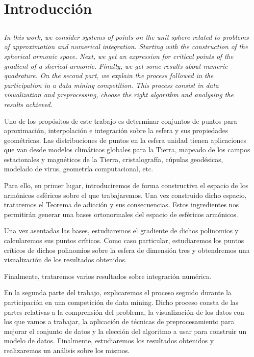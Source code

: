 \chapter*{Introducción}

\section*{}
\emph{In this work, we consider systems of points on the unit sphere related to problems of approximation and numerical integration. Starting with the construction of the spherical armonic space. Next, we get an expression for critical points of the gradient of a sherical armonic. Finally, we get some results about numeric quadrature.
On the second part, we explain the process followed in the participation in a data mining competition. This process consist in data visualization and preprocessing, choose the right algorithm and analysing the results achieved.}


\bigskip 

Uno de los propósitos de este trabajo es determinar conjuntos de puntos para aproximación, interpolación e integración sobre la esfera y sus propiedades geométricas. Las distribuciones de puntos en la esfera unidad tienen aplicaciones que van desde modelos climáticos globales para la  Tierra, mapeado de los campos estacionales y magnéticos de la Tierra, cristalografía, cúpulas geodésicas, modelado de virus, geometría computacional, etc.
 
\medskip
Para ello, en primer lugar, introduciremos de forma constructiva el espacio de los armónicos esféricos sobre el que trabajaremos. Una vez construido dicho espacio, trataremos el Teorema de adicción y sus consecuencias. Estos ingredientes nos permitirán generar una bases ortonormales del espacio de esféricos armónicos.

Una vez asentadas las bases, estudiaremos el gradiente de dichos polinomios y calcularemos sus puntos críticos. Como caso particular, estudiaremos los puntos críticos de dichos polinomios sobre la esfera de dimensión tres y obtendremos una visualización de los resultados obtenidos.

Finalmente, trataremos varios resultados sobre integración numérica.
\bigskip

En la segunda parte del trabajo, explicaremos el proceso seguido durante la participación en una competición de data mining. Dicho proceso consta de las partes relativas a la comprensión del problema, la visualización de los datos con los que vamos a trabajar, la aplicación de técnicas de preprocesamiento para mejorar el conjunto de datos y la elección del algoritmo a usar para construir un modelo de datos. Finalmente, estudiaremos los resultados obtenidos y realizaremos un análisis sobre los mismos. 

